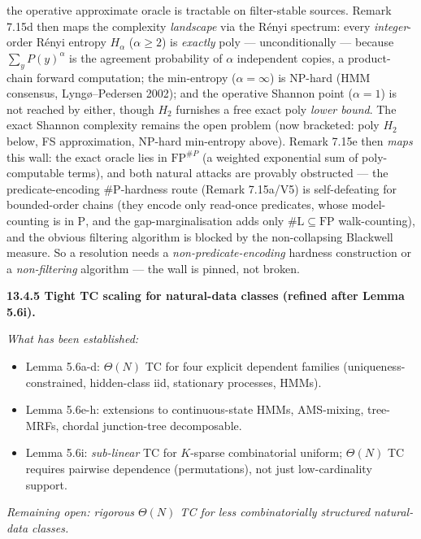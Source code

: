 \documentclass[
]{article}
\begin{document}
the operative approximate oracle is tractable on filter-stable sources. Remark
7.15d then maps the complexity \emph{landscape} via the R\'enyi spectrum: every
\emph{integer}-order R\'enyi entropy $H_\alpha$ ($\alpha\ge2$) is \emph{exactly}
poly --- unconditionally --- because $\sum_y P(y)^\alpha$ is the agreement
probability of $\alpha$ independent copies, a product-chain forward computation;
the min-entropy ($\alpha=\infty$) is NP-hard (HMM consensus, Lyng\o{}--Pedersen
2002); and the operative Shannon point ($\alpha=1$) is not reached by either,
though $H_2$ furnishes a free exact poly \emph{lower bound}. The exact Shannon
complexity remains the open problem (now bracketed: poly $H_2$ below, FS
approximation, NP-hard min-entropy above). Remark 7.15e then \emph{maps} this wall:
the exact oracle lies in $\mathrm{FP}^{\#P}$ (a weighted exponential sum of
poly-computable terms), and both natural attacks are provably obstructed --- the
predicate-encoding \#P-hardness route (Remark 7.15a/V5) is self-defeating for
bounded-order chains (they encode only read-once predicates, whose model-counting is
in $\mathrm P$, and the gap-marginalisation adds only $\#\mathrm L\subseteq\mathrm{FP}$
walk-counting), and the obvious filtering algorithm is blocked by the non-collapsing
Blackwell measure. So a resolution needs a \emph{non-predicate-encoding} hardness
construction or a \emph{non-filtering} algorithm --- the wall is pinned, not broken.

\textbf{13.4.5 Tight TC scaling for natural-data classes (refined
after Lemma 5.6i).}

\emph{What has been established:}
\begin{itemize}
\item Lemma 5.6a-d: $\Theta(N)$ TC for four explicit dependent
families (uniqueness-constrained, hidden-class iid, stationary
processes, HMMs).
\item Lemma 5.6e-h: extensions to continuous-state HMMs, AMS-mixing,
tree-MRFs, chordal junction-tree decomposable.
\item Lemma 5.6i: \emph{sub-linear} TC for $K$-sparse combinatorial
uniform; $\Theta(N)$ TC requires pairwise dependence (permutations),
not just low-cardinality support.
\end{itemize}

\emph{Remaining open: rigorous $\Theta(N)$ TC for less combinatorially
structured natural-data classes.}
\end{document}
